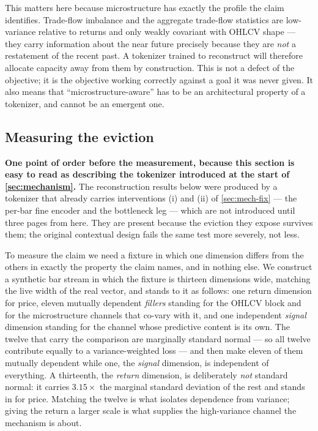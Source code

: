 This matters here because microstructure has exactly the profile the claim identifies. Trade-flow
imbalance and the aggregate trade-flow statistics are low-variance relative to returns and only
weakly covariant with OHLCV shape --- they carry information about the near future precisely
because they are \emph{not} a restatement of the recent past. A tokenizer trained to reconstruct
will therefore allocate capacity away from them by construction. This is not a defect of the
objective; it is the objective working correctly against a goal it was never given. It also means
that ``microstructure-aware'' has to be an architectural property of a tokenizer, and cannot be an
emergent one.

\subsection{Measuring the eviction}
\label{sec:mech-measure}

\textbf{One point of order before the measurement, because this section is easy to read as
describing the tokenizer introduced at the start of \cref{sec:mechanism}.} The reconstruction
results below were produced by a tokenizer that already carries interventions (i) and (ii) of
\cref{sec:mech-fix} --- the per-bar fine encoder and the bottleneck leg --- which are not
introduced until three pages from here. They are present because the eviction they expose survives
them; the original contextual design fails the same test more severely, not less.

To measure the claim we need a fixture in which one dimension differs from the others in exactly
the property the claim names, and in nothing else. We construct a synthetic bar stream in which
the fixture is thirteen dimensions wide, matching the live width of the real vector, and stands to
it as follows: one return dimension for price, eleven mutually dependent \emph{fillers} standing
for the OHLCV block and for the microstructure channels that co-vary with it, and one independent
\emph{signal} dimension standing for the channel whose predictive content is its own. The twelve
that carry the comparison are marginally standard normal --- so all twelve
contribute equally to a variance-weighted loss --- and then make eleven of them mutually dependent
while one, the \emph{signal} dimension, is independent of everything. A thirteenth, the
\emph{return} dimension, is deliberately \emph{not} standard normal: it carries $3.15\times$ the
marginal standard deviation of the rest and stands in for price. Matching the twelve is what
isolates dependence from variance; giving the return a larger scale is what supplies the
high-variance channel the mechanism is about.

